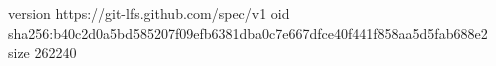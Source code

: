 version https://git-lfs.github.com/spec/v1
oid sha256:b40c2d0a5bd585207f09efb6381dba0c7e667dfce40f441f858aa5d5fab688e2
size 262240

